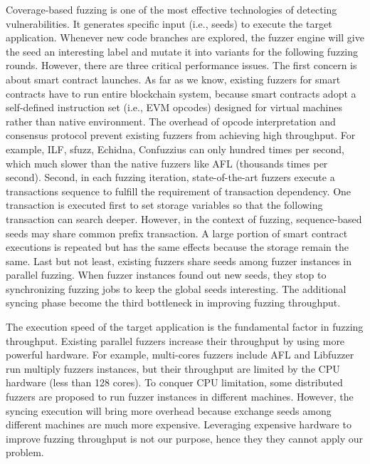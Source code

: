 Coverage-based fuzzing is one of the most effective technologies of detecting vulnerabilities\cite{fuzzingsurvey}. 
It generates specific input (i.e., seeds) to execute the target application.
Whenever new code branches are explored, the fuzzer engine will give the seed an interesting label and mutate it into variants for the following fuzzing rounds.
However, there are three critical performance issues.
%
The first concern is about smart contract launches. 
As far as we know, existing fuzzers for smart contracts have to run entire blockchain system, because smart contracts adopt a self-defined instruction set (i.e., EVM opcodes) designed for virtual machines rather than native environment. 
The overhead of opcode interpretation and consensus protocol prevent existing fuzzers from achieving high throughput. 
For example, ILF\cite{ilf_ccs}, sfuzz\cite{sfuzz_icse}, Echidna\cite{echidna_issta}, Confuzzius\cite{confuzzius_eurosp} can only hundred times per second, which much slower than the native fuzzers like AFL\cite{afl} (thousands times per second).
%
Second, in each fuzzing iteration, state-of-the-art fuzzers execute a transactions sequence to fulfill the requirement of transaction dependency\cite{confuzzius_eurosp}.
One transaction is executed first to set storage variables so that the following transaction can search deeper. 
However, in the context of fuzzing, sequence-based seeds may share common prefix transaction.
A large portion of smart contract executions is repeated but has the same effects because the storage remain the same. 
%
Last but not least, existing fuzzers share seeds among fuzzer instances in parallel fuzzing.
When fuzzer instances found out new seeds, they stop to synchronizing fuzzing jobs to keep the global seeds interesting.
The additional syncing phase become the third bottleneck in improving fuzzing throughput. 

The execution speed of the target application is the fundamental factor in fuzzing throughput\cite{fuzzan_atc}. 
Existing parallel fuzzers increase their throughput by using more powerful hardware.
For example, multi-cores fuzzers include AFL and Libfuzzer run multiply fuzzers instances, but their throughput are limited by the CPU hardware (less than 128 cores).
To conquer CPU limitation, some distributed fuzzers\cite{distributed_fuzz, disfuzz-afl, wtf} are proposed to run fuzzer instances in different machines. However, the syncing execution will bring more overhead because exchange seeds among different machines are much more expensive.  
Leveraging expensive hardware to improve fuzzing throughput is not our purpose, hence they they cannot apply our problem.


